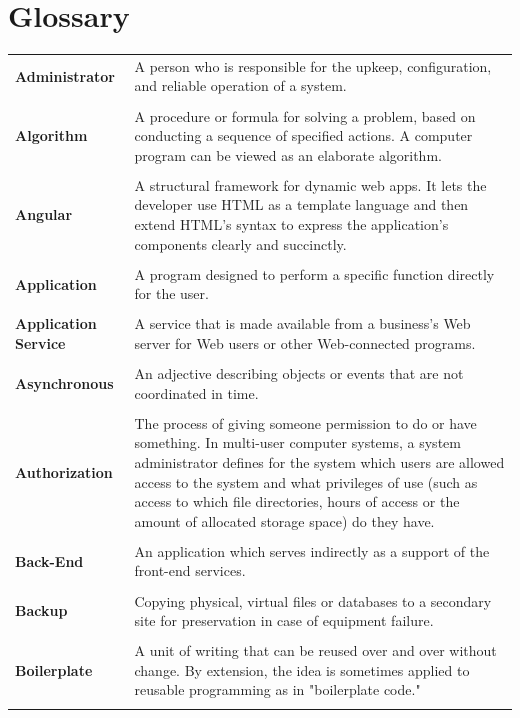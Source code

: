 \documentclass[a4paper,11pt,twoside]{report}
\theoremstyle{definition}
\begin{document}
\chapter*{Glossary}
\begin{longtable}{p{4cm} p{11cm}}

\textbf{Administrator} & A person who is responsible for the upkeep, configuration, and reliable operation of a system.\\ \\
\textbf{Algorithm} & A procedure or formula for solving a problem, based on conducting a sequence of specified actions. A computer program can be viewed as an elaborate algorithm. \\ \\
\textbf{Angular} & A structural framework for dynamic web apps. It lets the developer use HTML as a template language and then extend HTML's syntax to express the application's components clearly and succinctly. \\ \\
\textbf{Application} & A program designed to perform a specific function directly for the user.\\ \\
\textbf{Application Service} & A service that is made available from a business's Web server for Web users or other Web-connected programs. \\ \\
\textbf{Asynchronous} & An adjective describing objects or events that are not coordinated in time.\\ \\
\textbf{Authorization} & The process of giving someone permission to do or have something. In multi-user computer systems, a system administrator defines for the system which users are allowed access to the system and what privileges of use (such as access to which file directories, hours of access or the amount of allocated storage space) do they have. \\ \\
\textbf{Back-End} & An application which serves indirectly as a support of the front-end services.\\ \\
\textbf{Backup} & Copying physical, virtual files or databases to a secondary site for preservation in case of equipment failure. \\ \\
\textbf{Boilerplate} & A unit of writing that can be reused over and over without change. By extension, the idea is sometimes applied to reusable programming as in "boilerplate code."\\ \\

\end{longtable}
\end{document}
